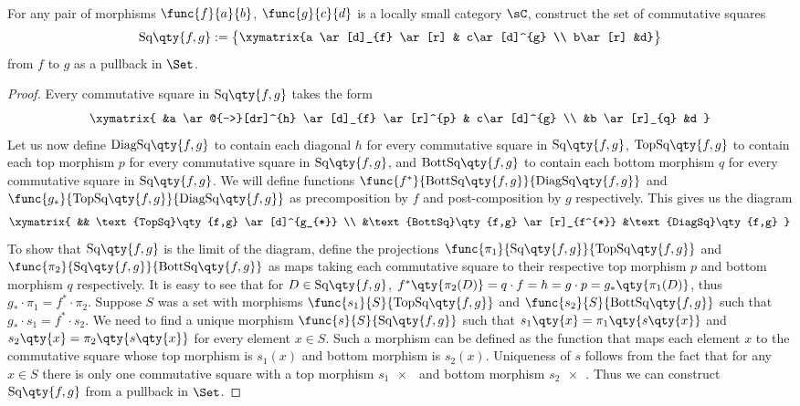 \documentclass[main.tex]{subfiles}
\begin{document}
	
\paragraph{}	
	\begin{exercise}
		
	 For any pair of morphisms $\func{f}{a}{b}$, $\func{g}{c}{d}$ is a locally small category $\sC$, construct the set of commutative squares $$\text{Sq}\qty{f,g} :=  \left\{\begin{gathered}\xymatrix{a \ar[d]_{f} \ar[r] & c\ar[d]^{g}  \\ b\ar[r] &d}\end{gathered}\right\}  $$ from $f$ to $g$ as a pullback in $\Set$.
	
	\end{exercise}
	
	
	\begin{proof}
		
	Every commutative square in $\text{Sq}\qty{f,g}$ takes the form
	$$\xymatrix{ &a \ar@{-->}[dr]^{h} \ar[d]_{f} \ar[r]^{p} & c\ar[d]^{g}
	\\   &b \ar[r]_{q} &d  } $$  Let us now define
		$\text{DiagSq}\qty{f,g}$ to contain each diagonal $h$ for every
		commutative square in $\text{Sq}\qty{f,g}$,
		$\text{TopSq}\qty{f,g}$ to contain each top morphism $p$ for
		every commutative square in $\text{Sq}\qty{f,g}$, and
		$\text{BottSq}\qty{f,g}$ to contain each bottom morphism $q$
		for every commutative square in $\text{Sq}\qty{f,g}$. We will
		define functions
		$\func{f^{*}}{\text{BottSq}\qty{f,g}}{\text{DiagSq}\qty{f,g}}$
		and
		$\func{g_{*}}{\text{TopSq}\qty{f,g}}{\text{DiagSq}\qty{f,g}}$
		as precomposition by $f$ and post-composition by $g$
		respectively. This gives us the diagram $$\xymatrix{  &&
		\text{TopSq}\qty{f,g} \ar[d]^{g_{*}}  \\
								      &\text{BottSq}\qty{f,g}
		\ar[r]_{f^{*}} &\text{DiagSq}\qty{f,g}  } $$ To show that
		$\text{Sq}\qty{f,g}$ is the limit of the diagram, define the
		projections
		$\func{\pi_{1}}{\text{Sq}\qty{f,g}}{\text{TopSq}\qty{f,g}}$ and
		$\func{\pi_{2}}{\text{Sq}\qty{f,g}}{\text{BottSq}\qty{f,g}}$ as
		maps taking each commutative square to their respective top
		morphism $p$ and bottom morphism $q$ respectively. It is easy
		to see that for $D \in \text{Sq}\qty{f,g}$,
		$f^{*}\qty{\pi_{2}(D)} = q \cdot f = h = g \cdot p =
		g_{*}\qty{\pi_{1}(D)}$, thus $g_{*} \cdot \pi_{1} =  f^{*}
		\cdot \pi_{2}$. Suppose $S$ was a set with morphisms
		$\func{s_{1}}{S}{\text{TopSq}\qty{f,g}}$ and
		$\func{s_{2}}{S}{\text{BottSq}\qty{f,g}}$ such that $g_{*}
		\cdot s_{1} =  f^{*} \cdot s_{2}$. We need to find a unique
		morphism  $\func{s}{S}{\text{Sq}\qty{f,g}}$ such that
		$s_{1}\qty{x} = \pi_{1}\qty{s\qty{x}}$ and $s_{2}\qty{x} =
		\pi_{2}\qty{s\qty{x}}$ for every element $x \in S$. Such a
		morphism can be defined as the function that maps each element
		$x$ to the commutative square whose top morphism is $s_{1}(x)$
		and bottom morphism is $s_{2}(x)$. Uniqueness of $s$ follows
		from the fact that for any $x \in S$ there is only one
		commutative square with a top morphism $s_{1}\qty{x}$ and
		bottom morphism $s_{2}\qty{x}$. Thus we can construct
		$\text{Sq}\qty{f,g}$ from a pullback in $\Set$.
	
	
		
	\end{proof}
\end{document}
